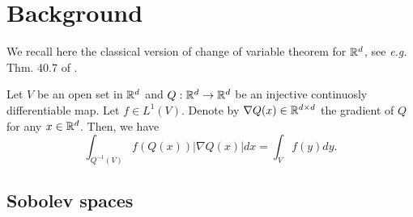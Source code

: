 \section{Background} \label{app:background}


We recall here the classical version of change of variable theorem for $\mathbb R^d$, see \emph{e.g.\ } Thm. 40.7 of \citet{aliprantis1998principles}.
\begin{theorem}\label{thm:change-of-variable}
Let $V$ be an open set in $\mathbb R^d$ and $Q:\mathbb R^d \to \mathbb R^d$ be an injective continuosly differentiable map. Let $f \in L^1(V)$. Denote by $\nabla Q(x) \in \mathbb R^{d\times d}$ the gradient of $Q$ for any $x \in \mathbb R^d$. Then, we have
$$\int_{Q^{-1}(V)} f(Q(x)) |\nabla Q(x)| dx = \int_{V} f(y) dy. $$
\end{theorem}


\subsection{Sobolev spaces}

